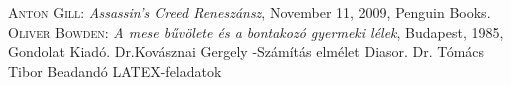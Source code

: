 \documentclass{thesis-ekf}
\theoremstyle{definition}
\theoremstyle{remark}
\begin{document}


\begin{thebibliography}{4}
    \textsc{Anton Gill}: \emph{Assassin's Creed Reneszánsz}, November 11, 2009, 	Penguin Books.
    \textsc{Oliver Bowden}: \emph{A mese bűvölete és a bontakozó gyermeki lélek}, Budapest, 1985, Gondolat Kiadó.
     Dr.Kovásznai Gergely -Számítás elmélet Diasor.
	 Dr. Tómács Tibor Beadandó LATEX-feladatok
\end{thebibliography}
\end{document}
